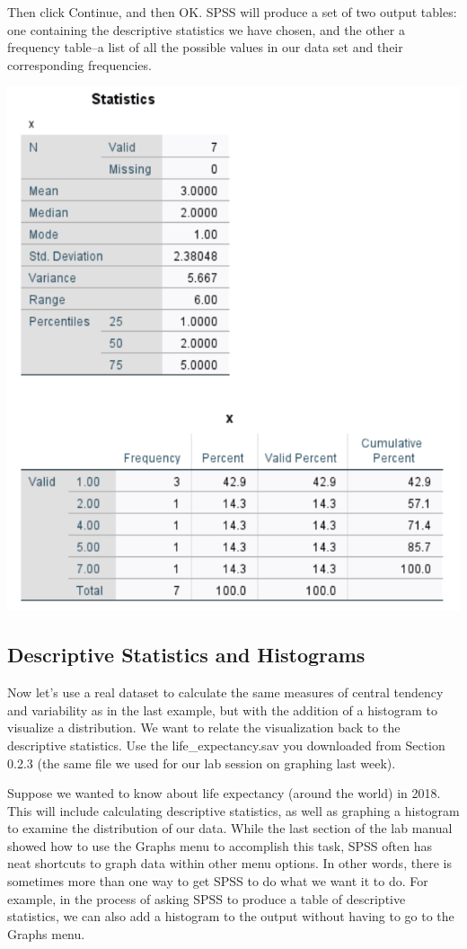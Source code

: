 \documentclass[
]{book}
\begin{document}
Then click {Continue}, and then {OK}. SPSS will produce a set of two output tables: one containing the descriptive statistics we have chosen, and the other a frequency table--a list of all the possible values in our data set and their corresponding frequencies.

\includegraphics{img/2.4.15.png}

\hypertarget{descriptive-statistics-and-histograms}{%
\subsection{Descriptive Statistics and Histograms}\label{descriptive-statistics-and-histograms}}

Now let's use a real dataset to calculate the same measures of central tendency and variability as in the last example, but with the addition of a histogram to visualize a distribution. We want to relate the visualization back to the descriptive statistics. Use the life\_expectancy.sav you downloaded from Section 0.2.3 (the same file we used for our lab session on graphing last week).

Suppose we wanted to know about life expectancy (around the world) in 2018. This will include calculating descriptive statistics, as well as graphing a histogram to examine the distribution of our data. While the last section of the lab manual showed how to use the {Graphs} menu to accomplish this task, SPSS often has neat shortcuts to graph data within other menu options. In other words, there is sometimes more than one way to get SPSS to do what we want it to do. For example, in the process of asking SPSS to produce a table of descriptive statistics, we can also add a histogram to the output without having to go to the {Graphs} menu.
\end{document}
